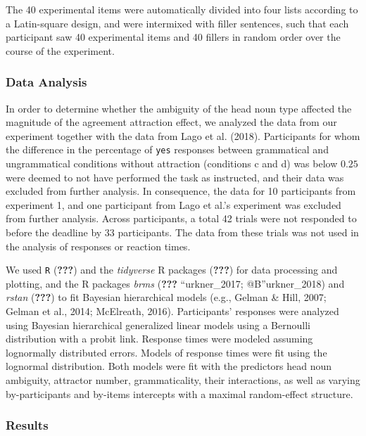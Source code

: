 \documentclass[english,doc]{apa6}
\begin{document}
The 40 experimental items were automatically divided into four lists according to a Latin-square design, and were intermixed with filler sentences, such that each participant saw 40 experimental items and 40 fillers in random order over the course of the experiment.

\hypertarget{data-analysis}{%
\subsubsection{Data Analysis}\label{data-analysis}}

In order to determine whether the ambiguity of the head noun type affected the magnitude of the agreement attraction effect, we analyzed the data from our experiment
together with the data from Lago et al. (2018).
Participants for whom the difference in the percentage of \texttt{yes} responses between grammatical and ungrammatical conditions without attraction (conditions c and d) was below \(0.25\) were deemed to not have performed the task as instructed, and their data was excluded from further analysis. In consequence, the data for 10 participants from experiment 1, and one participant from Lago et al.'s experiment was excluded from further analysis.
Across participants, a total 42 trials were not responded to before the deadline by 33 participants. The data from these trials was not used in the analysis of responses or reaction times.

We used \texttt{R} ({\textbf{???}}) and the \emph{tidyverse} R packages ({\textbf{???}}) for data processing and plotting, and the R packages \emph{brms} ({\textbf{???}} ``urkner\_2017; @B''urkner\_2018) and \emph{rstan} ({\textbf{???}}) to fit Bayesian hierarchical models (e.g., Gelman \& Hill, 2007; Gelman et al., 2014; McElreath, 2016).
Participants' responses were analyzed using Bayesian hierarchical generalized linear models using a Bernoulli distribution with a probit link.
Response times were modeled assuming lognormally distributed errors.
Models of response times were fit using the lognormal distribution. Both models were fit with the predictors
head noun ambiguity, attractor number, grammaticality, their interactions, as well as varying by-participants and by-items intercepts with a maximal random-effect structure.

\hypertarget{results}{%
\subsubsection{Results}\label{results}}
\end{document}
